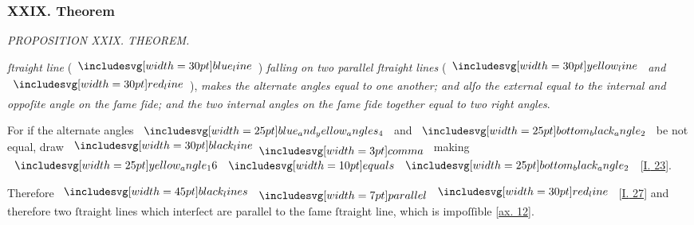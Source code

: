 \documentclass[12pt,preview]{standalone}
\begin{document}
\subsubsection{XXIX. Theorem}

\begin{minipage}[t]{0.33\textwidth}
    \vspace{40pt}
    
\end{minipage}%
\hfill
\begin{minipage}[t]{0.64\textwidth}
    \vspace{0pt}

    \begin{center}
        \textit{PROPOSITION XXIX. THEOREM.}\label{book1pr29} \\
    \end{center}

    \hfill

    \begin{center}
        \raggedright \lettrine[lines=4, loversize=1, nindent=0pt]{}{} \textit{ſtraight line} (\hspace{-1ex}$\blueline$\hspace{-1ex}) \textit{falling on two parallel ſtraight lines} (\hspace{-1ex}$\yellowline$ \textit{and} $\redline$\hspace{-1ex}), \textit{makes the alternate angles equal to one another; and alſo the external equal to the internal and oppoſite angle on the ſame ſide; and the two internal angles on the ſame ſide together equal to two right angles}.
    \end{center}

    \hfill

    \hfill

    \raggedright For if the alternate angles $\img{blue_and_yellow_angles_4}$ and $\img{bottom_black_angle_2}$ be not equal, draw $\blackline \bcomma$ making $\img{yellow_angle_16} \bequals \img{bottom_black_angle_2}$ [\hyperref[book1pr23]{\textsc{I.} 23}].

    \hfill

    \hfill

    \raggedright Therefore $\blacklines \bparallel \redline$ [\hyperref[book1pr27]{\textsc{I.} 27}] and therefore two ſtraight lines which interſect are parallel to the ſame ſtraight line, which is impoſſible [\hyperref[ax12]{ax. 12}].

    \hfill


\end{minipage}
\end{document}
